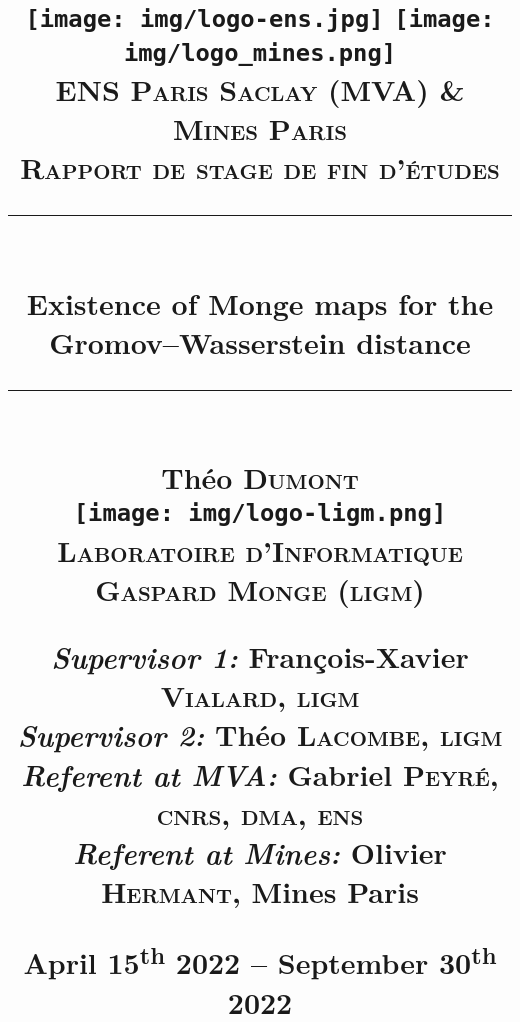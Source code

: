\title{
    \vspace{-4cm}
    \texttt{[image: img/logo-ens.jpg]}
    \hspace{1cm}
    \texttt{[image: img/logo\_mines.png]}
    \\
    \vspace{1cm}
    \large \textsc{ENS Paris Saclay (MVA) \& Mines Paris}\\
    \large \textsc{Rapport de stage de fin d'études}\\
    \vspace{1cm}
    \par\noindent\rule{.8\textwidth}{0.4pt}\\
    \vspace{1mm}
    \huge \textbf{Existence of Monge maps for the Gromov--Wasserstein distance}\\
    \vspace{-4mm}
    \par\noindent\rule{.8\textwidth}{0.4pt}\\
    \vspace{1cm}
    \Large Théo \textsc{Dumont}\\
    \vspace{2cm}
    \texttt{[image: img/logo-ligm.png]}\\
    \large \textsc{Laboratoire d'Informatique Gaspard Monge (\textsc{ligm})}\\
    \vspace{1cm}
    \begin{flushleft}
        \large \textit{Supervisor 1:} François-Xavier \textsc{Vialard}, \textsc{ligm}\\
        \large \textit{Supervisor 2:} Théo \textsc{Lacombe}, \textsc{ligm}\\
        \large \textit{Referent at MVA:} Gabriel \textsc{Peyré}, \textsc{cnrs, dma, ens}\\
        \large \textit{Referent at Mines:} Olivier \textsc{Hermant}, {Mines Paris}
    \end{flushleft}
    \vfill
    \large April 15\textsuperscript{th} 2022 -- September 30\textsuperscript{th} 2022
}
\author{}
\date{}

\fancyhf{}
\fancyhead[L]{\thepage}
\fancyhead[R]{\leftmark}
\newcommand{\Chapter}[1]{\chapter{#1}{\hypersetup{linkcolor=black}\minitoc\vspace{5mm}}}
\dominitoc


\usepackage{titlesec}
\titleformat{\chapter}[display]{\normalfont\huge\bfseries}{\chaptertitlename\ \thechapter}{20pt}{\Huge}
\titlespacing*{\chapter}{0pt}{-40pt}{40pt}
\usepackage{algpseudocode}
\usepackage{multirow}
\usepackage{mathdots}
\usepackage{sidecap}
\usepackage{mathtools}